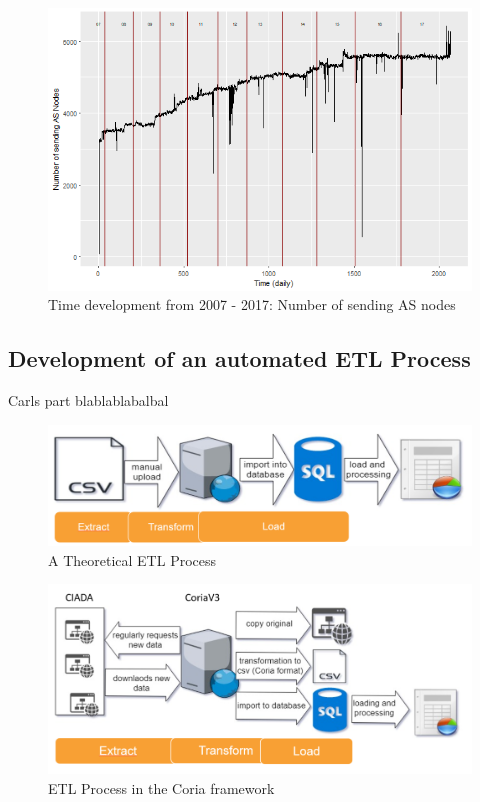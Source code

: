 \documentclass[conference]{IEEEtran}
\begin{document}
\begin{figure}[htbp]
\centerline{\includegraphics[scale=0.4]{Graphics/ASFromAll.png}}
\caption{Time development from 2007 - 2017: Number of sending AS nodes}
\label{fig}
\end{figure}


\subsection{Development of an automated ETL Process}

Carls part blablablabalbal



\begin{figure}[htbp]
\centerline{\includegraphics[scale=0.29]{Graphics/ETL1.PNG}}
\caption{A Theoretical ETL Process}
\label{fig}
\end{figure}

\begin{figure}[htbp]
\centerline{\includegraphics[scale=0.4]{Graphics/ETL2.PNG}}
\caption{ETL Process in the Coria framework}
\label{fig}
\end{figure}
\end{document}
